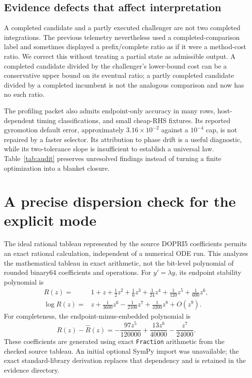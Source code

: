 \documentclass[aps,prd,reprint,amsmath,amssymb,longbibliography,nofootinbib]{revtex4-2}
\newcommand{\code}[1]{\texttt{#1}}
\begin{document}
\subsection{Evidence defects that affect interpretation}
A completed candidate and a partly executed challenger are not two completed integrations. The previous telemetry nevertheless used a completed-comparison label and sometimes displayed a prefix/complete ratio as if it were a method-cost ratio. We correct this without treating a partial state as admissible output. A completed candidate divided by the challenger's lower-bound cost can be a conservative upper bound on its eventual ratio; a partly completed candidate divided by a completed incumbent is not the analogous comparison and now has no such ratio.

The profiling packet also admits endpoint-only accuracy in many rows, host-dependent timing classifications, and small cheap-RHS fixtures. Its reported gyromotion default error, approximately $3.16\times10^{-2}$ against a $10^{-4}$ cap, is not repaired by a faster selector. Its attribution to phase drift is a useful diagnostic, while its two-tolerance slope is insufficient to establish a universal law. Table~\ref{tab:audit} preserves unresolved findings instead of turning a finite optimization into a blanket closure.



\section{A precise dispersion check for the explicit mode}
\label{sec:phase}
The ideal rational tableau represented by the source DOPRI5 coefficients permits an exact rational calculation, independent of a numerical ODE run. This analyzes the mathematical tableau in exact arithmetic, not the bit-level polynomial of rounded binary64 coefficients and operations. For $y'=\lambda y$, its endpoint stability polynomial is
\begin{align}
R(z)={}&1+z+\tfrac12z^2+\tfrac16z^3+\tfrac1{24}z^4
       +\tfrac1{120}z^5+\tfrac1{600}z^6,\\
\log R(z)={}&z+\tfrac1{3600}z^6-\tfrac1{2100}z^7
                +\tfrac1{3200}z^8+O(z^9).
\end{align}
For completeness, the endpoint-minus-embedded polynomial is
\begin{equation}
R(z)-\widehat R(z)=-\frac{97z^5}{120000}
                    +\frac{13z^6}{40000}-\frac{z^7}{24000}.
\end{equation}
These coefficients are generated using exact \code{Fraction} arithmetic from the checked source tableau. An initial optional SymPy import was unavailable; the exact standard-library derivation replaces that dependency and is retained in the evidence directory.
\end{document}
